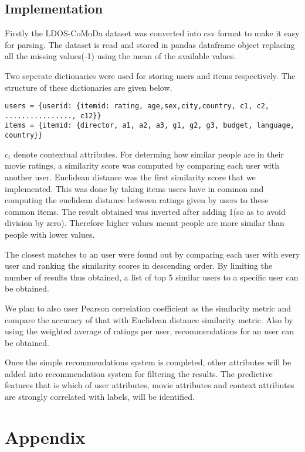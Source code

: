 \documentclass{article}
\begin{document}
\subsection{Implementation}

Firstly the LDOS-CoMoDa dataset was converted into csv format to make it easy for parsing. The dataset is read and stored in pandas dataframe object replacing all the missing values(-1) using the mean of the available values.

Two seperate dictionaries were used for storing users and items respectively. The structure of these dictionaries are given below.
\begin{verbatim}
users = {userid: {itemid: rating, age,sex,city,country, c1, c2, ................, c12}}
items = {itemid: {director, a1, a2, a3, g1, g2, g3, budget, language, country}}
\end{verbatim}

$c_{i}$ denote contextual attributes. For determing how similar people are in their movie ratings, a similarity score was computed by comparing each user with another user. Euclidean distance was the first similarity score that we implemented. This was done by taking items users have in common and computing the euclidean distance between ratings given by users to these common items. The result obtained was inverted after adding 1(so as to avoid division by zero). Therefore higher values meant people are more similar than people with lower values. 

The closest matches to an user were found out by comparing each user with every user and ranking the similarity scores in descending order. By limiting the number of results thus obtained, a list of top 5 similar users to a specific user can be obtained.

We plan to also user Pearson correlation coefficient as the similarity metric and compare the accuracy of that with Euclidean distance similarity metric. Also by using the weighted average of ratings per user,  recommendations for an user can be obtained. 

Once the simple recommendations system is completed, other attributes will be added into recommendation system for filtering the results. The predictive features that is which of user attributes, movie attributes and context attributes are strongly correlated with labels, will be identified. 

\pagebreak

\section{Appendix}
\end{document}
